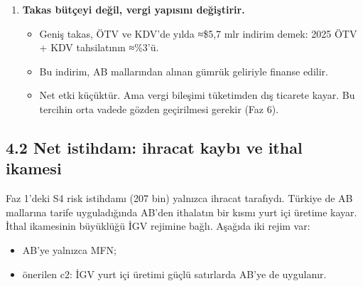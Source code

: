\begin{enumerate}
  \begin{itemize}
  \tightlist
  \item
    ``Geniş'' kapsamın pratik karşılığı şöyle: dar kapsama mobilya (KDV), gıda ve içecek (KDV) ve plastik ürünler eklenir.
  \item
    Bu üç ürün, c2'de dar takastan sonra kalan TÜFE etkisinin ≈\%80'ini oluşturuyor: mobilya 11,5 bp, gıda 5,9 bp, plastik 1,9 bp.
  \item
    Bu paket aynı zamanda AB'nin anlaşmasızlık maliyetini \$28,5 mlr'a çıkarıyor; c'de \$18,7 mlr. Müzakere kaldıracı açısından da en güçlüsü.
  \end{itemize}
\item
  \textbf{Takas bütçeyi değil, vergi yapısını değiştirir.}

  \begin{itemize}
  \tightlist
  \item
    Geniş takas, ÖTV ve KDV'de yılda ≈\$5,7 mlr indirim demek: 2025 ÖTV + KDV tahsilatının ≈\%3'ü.
  \item
    Bu indirim, AB mallarından alınan gümrük geliriyle finanse edilir.
  \item
    Net etki küçüktür. Ama vergi bileşimi tüketimden dış ticarete kayar. Bu tercihin orta vadede gözden geçirilmesi gerekir (Faz 6).
  \end{itemize}
\end{enumerate}

\hypertarget{02a_politika_uzayi-42-net-istihdam-ihracat-kaybux131-ve-ithal-ikamesi}{%
\subsection{4.2 Net istihdam: ihracat kaybı ve ithal ikamesi}\label{02a_politika_uzayi-42-net-istihdam-ihracat-kaybux131-ve-ithal-ikamesi}}

Faz 1'deki S4 risk istihdamı (207 bin) yalnızca ihracat tarafıydı. Türkiye de AB mallarına tarife uyguladığında AB'den ithalatın bir kısmı yurt içi üretime kayar. İthal ikamesinin büyüklüğü İGV rejimine bağlı. Aşağıda iki rejim var:

\begin{itemize}
\tightlist
\item
  AB'ye yalnızca MFN;
\item
  önerilen c2: İGV yurt içi üretimi güçlü satırlarda AB'ye de uygulanır.
\end{itemize}

\begingroup\gbtablo\small

